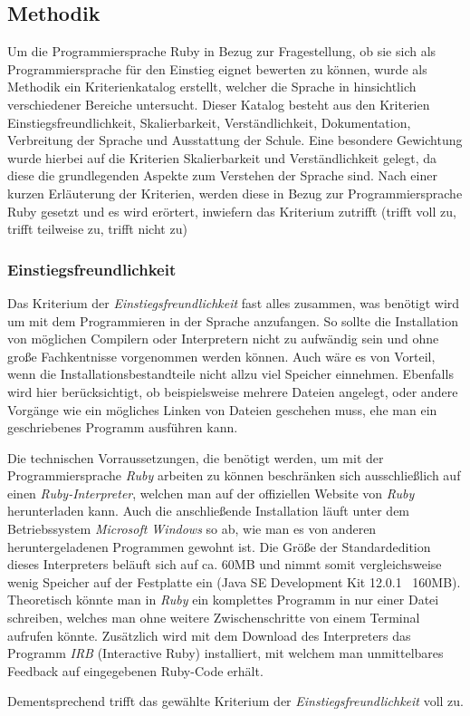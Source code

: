 \documentclass[12pt,DIV=14, version=first, BCOR=10mm,a4paper,twoside,parskip=half-,headsepline,headinclude]{scrartcl}
\begin{document}
\subsection{Methodik}
\begin{flushleft}
Um die Programmiersprache Ruby in Bezug zur Fragestellung, ob sie sich als Programmiersprache für den Einstieg eignet bewerten zu können, wurde als Methodik ein Kriterienkatalog erstellt, welcher die Sprache in hinsichtlich verschiedener Bereiche untersucht. Dieser Katalog besteht aus den Kriterien Einstiegsfreundlichkeit, Skalierbarkeit, Verständlichkeit, Dokumentation, Verbreitung der Sprache und Ausstattung der Schule. Eine besondere Gewichtung wurde hierbei auf die Kriterien Skalierbarkeit und Verständlichkeit gelegt, da diese die grundlegenden Aspekte zum Verstehen der Sprache sind. Nach einer kurzen Erläuterung der Kriterien, werden diese in Bezug zur Programmiersprache Ruby gesetzt und es wird erörtert, inwiefern das Kriterium zutrifft (trifft voll zu, trifft teilweise zu, trifft nicht zu)
\end{flushleft}

\subsubsection{Einstiegsfreundlichkeit} 

\begin{flushleft}
Das Kriterium der \textit{Einstiegsfreundlichkeit} fast alles zusammen, was benötigt wird um mit dem Programmieren in der Sprache anzufangen. So sollte die Installation von möglichen Compilern oder Interpretern nicht zu aufwändig sein und ohne große Fachkentnisse vorgenommen werden können. Auch wäre es von Vorteil, wenn die Installationsbestandteile nicht allzu viel Speicher einnehmen. Ebenfalls wird hier berücksichtigt, ob beispielsweise mehrere Dateien angelegt, oder andere Vorgänge wie ein mögliches Linken von Dateien geschehen muss, ehe man ein geschriebenes Programm ausführen kann.

Die technischen Vorraussetzungen, die benötigt werden, um mit der Programmiersprache \textit{\glqq Ruby\grqq} arbeiten zu können beschränken sich ausschließlich auf einen \textit{Ruby-Interpreter}, welchen man auf der offiziellen Website von \textit{\glqq Ruby\grqq} herunterladen kann. Auch die anschließende Installation läuft unter dem Betriebssystem \textit{Microsoft Windows} so ab, wie man es von anderen heruntergeladenen Programmen gewohnt ist. Die Größe der Standardedition dieses Interpreters beläuft sich auf ca. 60MB und nimmt somit vergleichsweise wenig Speicher auf der Festplatte ein (Java SE Development Kit 12.0.1 ~160MB).
Theoretisch könnte man in \textit{\glqq Ruby\grqq} ein komplettes Programm in nur einer Datei schreiben, welches man ohne weitere Zwischenschritte von einem Terminal aufrufen könnte. Zusätzlich wird mit dem Download des Interpreters das Programm \textit{IRB} (Interactive Ruby) installiert, mit welchem man unmittelbares Feedback auf eingegebenen Ruby-Code erhält.

Dementsprechend trifft das gewählte Kriterium der \textit{Einstiegsfreundlichkeit} voll zu.
\end{flushleft}
\end{document}
